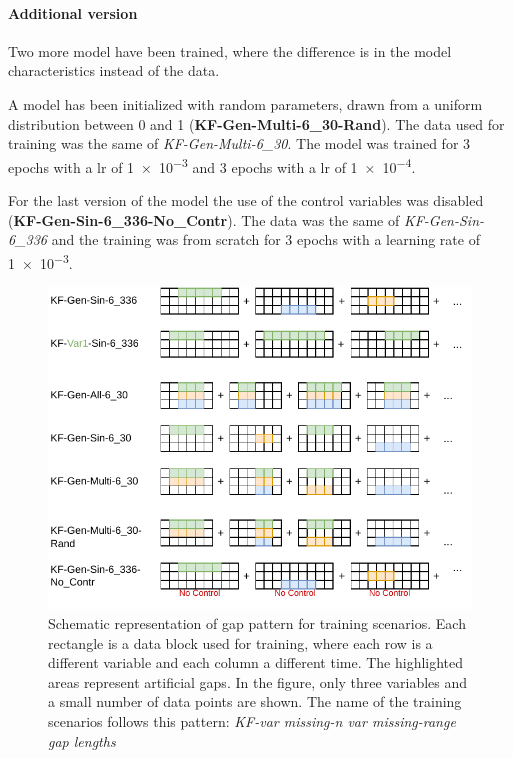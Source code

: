 \documentclass{article}
\begin{document}
\paragraph{Additional version} Two more model have been trained, where the difference is in the model characteristics instead of the data.

A model has been initialized with random parameters, drawn from a uniform distribution between 0 and 1 (\textbf{KF-Gen-Multi-6\_30-Rand}). The data used for training was the same of  \textit{KF-Gen-Multi-6\_30}. The model was trained for 3 epochs with a lr of \num{1e-3} and 3 epochs with a lr of \num{1e-4}. 

For the last version of the model the use of the control variables was disabled (\textbf{KF-Gen-Sin-6\_336-No\_Contr}). The data was the same of \textit{KF-Gen-Sin-6\_336} and the training was from scratch for \num{3} epochs with a learning rate of \num{1e-3}.

\begin{figure}
\centerline{\includegraphics[width=\textwidth]{training scenarios}}
\caption{Schematic representation of gap pattern for training scenarios. Each rectangle is a data block used for training, where each row is a different variable and each column a different time. The highlighted areas represent artificial gaps. In the figure, only three variables and a small number of data points are shown. The name of the training scenarios follows this pattern: \textit{KF-\textlangle var missing\textrangle-\textlangle n var missing\textrangle-\textlangle range gap lengths }}
\label{fig:training}
\end{figure}
\end{document}
